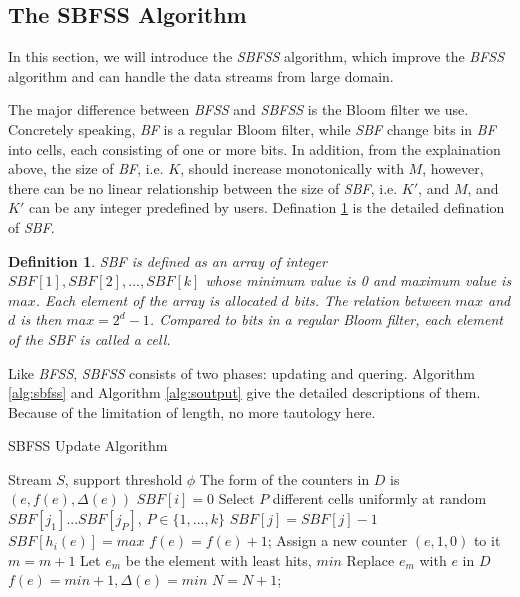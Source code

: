 \documentclass[conference]{IEEEtran}
\begin{document}
\subsection{The SBFSS Algorithm}\label{sec:sbfss}
In this section, we will introduce the \emph{SBFSS} algorithm, which improve the \emph{BFSS} algorithm and can handle the data streams from large domain.\par
The major difference between \emph{BFSS} and \emph{SBFSS} is the Bloom filter we use. Concretely speaking, \emph{BF} is a regular Bloom filter, while \emph{SBF} change bits in \emph{BF} into cells, each consisting of one or more bits. In addition, from the explaination above, the size of \emph{BF}, i.e. $K$, should increase monotonically with $M$, however, there can be no linear relationship between the size of \emph{SBF}, i.e. $K'$, and $M$, and $K'$ can be any integer predefined by users. Defination \ref{def:1} is the detailed defination of \emph{SBF}.\par  

\newtheorem{defn}{Definition}
\begin{defn}\label{def:1}
\emph{SBF} is defined as an array of integer $SBF[1],SBF[2],...,SBF[k]$ whose minimum value is 0 and maximum value is $max$. Each element of the array is allocated $d$ bits. The relation between $max$ and $d$ is then $max=2^d-1$. Compared to bits in a regular Bloom ﬁlter, each element of the \emph{SBF} is called a cell.
\end{defn}

Like \emph{BFSS}, \emph{SBFSS} consists of two phases: updating and quering. Algorithm \ref{alg:sbfss} and Algorithm \ref{alg:soutput} give the detailed descriptions of them.   Because of the limitation of length, no more tautology here.

\begin{algorithm}[h]
	\caption{SBFSS Update Algorithm}
	\label{alg:sbfss}
	\begin{algorithmic}[1]
		\REQUIRE Stream $S$, support threshold $\phi$
		\STATE The form of the counters in $D$ is $(e,f(e),\Delta(e))$
		\STATE $SBF[i]=0$
		\ENDFOR
		\STATE Select $P$ different cells uniformly at random $SBF[j_1]...SBF[j_P]$, $P\in \{1,...,k\}$
		\STATE $SBF[j]=SBF[j]-1$
		\ENDIF
		\ENDFOR
		\STATE $SBF[h_i(e)]=max$
		\ENDFOR
		\STATE $f(e)=f(e)+1$;
		\STATE Assign a new counter $(e,1,0)$ to it
		\STATE $m=m+1$
		\ELSE
		\STATE Let $e_m$ be the element with least hits, $min$
		\STATE Replace $e_m$ with $e$ in $D$
		\STATE $f(e)=min+1,\Delta(e)=min$
		\ENDIF
		\STATE $N=N+1$;
		\ENDFOR
	\end{algorithmic}
\end{algorithm}
\end{document}
